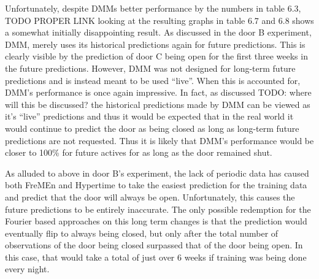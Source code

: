 Unfortunately, despite DMMs better performance by the numbers in table 6.3, TODO PROPER LINK
looking at the resulting graphs in table 6.7 and 6.8 shows a somewhat
initially disappointing result. As discussed in the door B experiment,
DMM, merely uses its historical predictions again for future
predictions. This is clearly visible by the prediction of door C being open
for the first three weeks in the future predictions.  However, DMM was not
designed for long-term future predictions and is instead meant to be used
``live''. When this is accounted for, DMM's performance is once again
impressive.  In fact, as discussed TODO: where will this be discussed? the
historical predictions made by DMM can be viewed as it's ``live''
predictions and thus it would be expected that in the real world it would
continue to predict the door as being closed as long as long-term future
predictions are not requested. Thus it is likely that DMM's
performance would be closer to 100\% for future actives for as long as the door
remained shut. \\

\begin{table}[h!]
  \centering

  \caption{Door C Data Overview}
\end{table}

As alluded to above in door B's experiment, the lack of periodic data has
caused both FreMEn and Hypertime to take the easiest prediction for the
training data and predict that the door will always be open. Unfortunately,
this causes the future predictions to be entirely inaccurate. The only possible redemption
for the Fourier based approaches on this long term changes is that the
prediction would eventually flip to always being closed, but only after the total number of observations of the door being
closed surpassed that of the door being open. In this case, that would take a
total of just over 6 weeks if training was being done every night. \\

